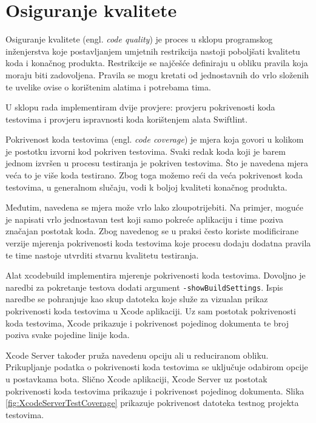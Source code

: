 \documentclass[times, utf8, diplomski, numeric]{fer}
\newcommand{\eng}[1]{(engl. \textit{#1})}
\begin{document}
\section{Osiguranje kvalitete}

Osiguranje kvalitete \eng{code quality} je proces u sklopu programskog inženjerstva koje postavljanjem umjetnih restrikcija nastoji poboljšati kvalitetu koda i konačnog produkta. Restrikcije se najčešće definiraju u obliku pravila koja moraju biti zadovoljena. Pravila se mogu kretati od jednostavnih do vrlo složenih te uvelike ovise o korištenim alatima i potrebama tima.

U sklopu rada implementiram dvije provjere: provjeru pokrivenosti koda testovima i provjeru ispravnosti koda korištenjem alata Swiftlint.

Pokrivenost koda testovima \eng{code coverage} je mjera koja govori u kolikom je postotku izvorni kod pokriven testovima. Svaki redak koda koji je barem jednom izvršen u procesu testiranja je pokriven testovima. Što je navedena mjera veća to je više koda testirano. Zbog toga možemo reći da veća pokrivenost koda testovima, u generalnom slučaju, vodi k boljoj kvaliteti konačnog produkta.

Međutim, navedena se mjera može vrlo lako zloupotrijebiti. Na primjer, moguće je napisati vrlo jednostavan test koji samo pokreće aplikaciju i time poziva značajan postotak koda. Zbog navedenog se u praksi često koriste modificirane verzije mjerenja pokrivenosti koda testovima koje procesu dodaju dodatna pravila te time nastoje utvrditi stvarnu kvalitetu testiranja\citep{wiki:CodeCoverage}.

Alat xcodebuild implementira mjerenje pokrivenosti koda testovima. Dovoljno je naredbi za pokretanje testova dodati argument \verb|-showBuildSettings|. Ispis naredbe se pohranjuje kao skup datoteka koje služe za vizualan prikaz pokrivenosti koda testovima u Xcode aplikaciji. Uz sam postotak pokrivenosti koda testovima, Xcode prikazuje i pokrivenost pojedinog dokumenta te broj poziva svake pojedine linije koda.

Xcode Server također pruža navedenu opciju ali u reduciranom obliku. Prikupljanje podatka o pokrivenosti koda testovima se uključuje odabirom opcije  u postavkama bota. Slično Xcode aplikaciji, Xcode Server uz postotak pokrivenosti koda testovima prikazuje i pokrivenost pojedinog dokumenta. Slika \ref{fig:XcodeServerTestCoverage} prikazuje pokrivenost datoteka testnog projekta testovima.
\end{document}
